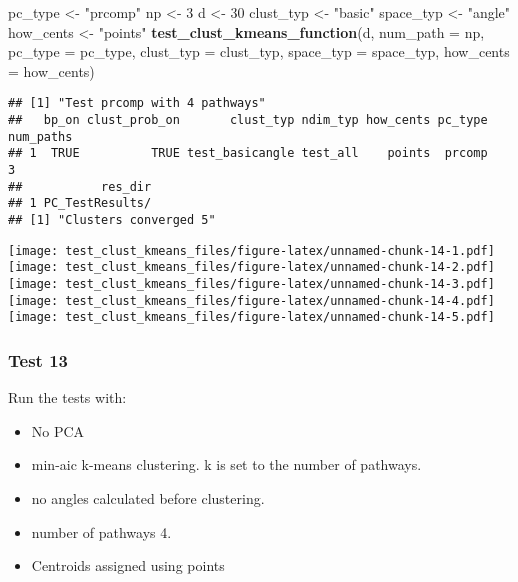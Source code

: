 \documentclass[
]{article}
\newenvironment{Shaded}{\begin{snugshade}}{\end{snugshade}}
\newcommand{\AttributeTok}[1]{\textcolor[rgb]{0.13,0.29,0.53}{#1}}
\newcommand{\DecValTok}[1]{\textcolor[rgb]{0.00,0.00,0.81}{#1}}
\newcommand{\FunctionTok}[1]{\textcolor[rgb]{0.13,0.29,0.53}{\textbf{#1}}}
\newcommand{\NormalTok}[1]{#1}
\newcommand{\OtherTok}[1]{\textcolor[rgb]{0.56,0.35,0.01}{#1}}
\newcommand{\StringTok}[1]{\textcolor[rgb]{0.31,0.60,0.02}{#1}}
\providecommand{\tightlist}{%
  \setlength{\itemsep}{0pt}\setlength{\parskip}{0pt}}
\begin{document}
\begin{Shaded}
\begin{Highlighting}[]
\NormalTok{pc\_type }\OtherTok{\textless{}{-}} \StringTok{"prcomp"}
\NormalTok{np }\OtherTok{\textless{}{-}} \DecValTok{3}
\NormalTok{d }\OtherTok{\textless{}{-}} \DecValTok{30}
\NormalTok{clust\_typ }\OtherTok{\textless{}{-}} \StringTok{"basic"}
\NormalTok{space\_typ }\OtherTok{\textless{}{-}} \StringTok{"angle"}
\NormalTok{how\_cents }\OtherTok{\textless{}{-}} \StringTok{"points"}
\FunctionTok{test\_clust\_kmeans\_function}\NormalTok{(d,}
                           \AttributeTok{num\_path =}\NormalTok{ np,}
                           \AttributeTok{pc\_type =}\NormalTok{ pc\_type,}
                           \AttributeTok{clust\_typ =}\NormalTok{ clust\_typ,}
                           \AttributeTok{space\_typ =}\NormalTok{ space\_typ,}
                           \AttributeTok{how\_cents =}\NormalTok{ how\_cents)}
\end{Highlighting}
\end{Shaded}

\begin{verbatim}
## [1] "Test prcomp with 4 pathways"
##   bp_on clust_prob_on       clust_typ ndim_typ how_cents pc_type num_paths
## 1  TRUE          TRUE test_basicangle test_all    points  prcomp         3
##           res_dir
## 1 PC_TestResults/
## [1] "Clusters converged 5"
\end{verbatim}

\texttt{[image: test\_clust\_kmeans\_files/figure-latex/unnamed-chunk-14-1.pdf]}
\texttt{[image: test\_clust\_kmeans\_files/figure-latex/unnamed-chunk-14-2.pdf]}
\texttt{[image: test\_clust\_kmeans\_files/figure-latex/unnamed-chunk-14-3.pdf]}
\texttt{[image: test\_clust\_kmeans\_files/figure-latex/unnamed-chunk-14-4.pdf]}
\texttt{[image: test\_clust\_kmeans\_files/figure-latex/unnamed-chunk-14-5.pdf]}

\hypertarget{test-13}{%
\subsubsection{Test 13}\label{test-13}}

Run the tests with:

\begin{itemize}
\tightlist
\item
  No PCA
\item
  min-aic k-means clustering. k is set to the number of pathways.
\item
  no angles calculated before clustering.
\item
  number of pathways 4.
\item
  Centroids assigned using points
\end{itemize}
\end{document}
